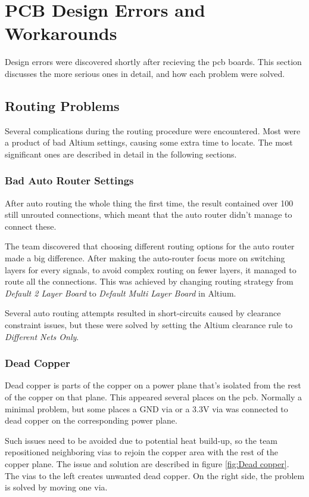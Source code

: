 \section{PCB Design Errors and Workarounds}
Design errors were discovered shortly after recieving the \gls{pcb} boards.
This section discusses the more serious ones in detail, and how each problem were solved.

\subsection{Routing Problems}
\label{Routing Problems}
Several complications during the routing procedure were encountered.
Most were a product of bad Altium settings, causing some extra time to locate.
The most significant ones are described in detail in the following sections.

\subsubsection{Bad Auto Router Settings}
After auto routing the whole thing the first time, the result contained over 100 still unrouted connections,
which meant that the auto router didn't manage to connect these.

The team discovered that choosing different routing options for the auto router made a big difference.
After making the auto-router focus more on switching layers for every signals,
to avoid complex routing on fewer layers, it managed to route all the connections.
This was achieved by changing routing strategy from \emph{Default 2 Layer Board} to \emph{Default Multi Layer Board} in Altium.

Several auto routing attempts resulted in short-circuits caused by clearance constraint issues, but these were solved by setting the Altium clearance rule to \emph{Different Nets Only}.

\subsubsection{Dead Copper}
Dead copper is parts of the copper on a power plane that's isolated from the rest of the copper on that plane.
This appeared several places on the \gls{pcb}. Normally a minimal problem, but some places a GND via or a 3.3V via was connected to dead copper on the corresponding power plane.

Such issues need to be avoided due to potential heat build-up, so the team repositioned neighboring vias to rejoin the copper area with the rest of the copper plane. The issue and solution are described in figure \ref{fig:Dead copper}. The vias to the left creates unwanted dead copper. On the right side, the problem is solved by moving one via.


